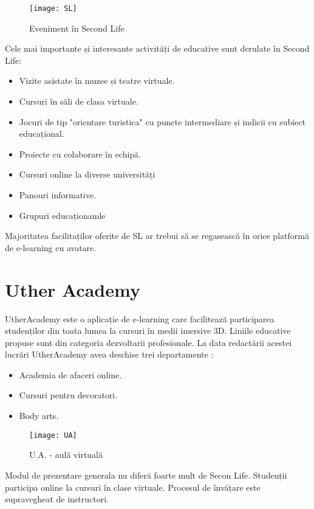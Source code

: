 \begin{figure}[h]
    \centering
    \texttt{[image: SL]}
    \caption{Eveniment în Second Life}
    \label{fig:imag3}
\end{figure}

\par Cele mai importante și interesante activități de educative sunt derulate în Second Life:
\begin{itemize}
\item Vizite asistate în muzee și teatre virtuale.
\item Cursuri în săli de clasa virtuale.
\item Jocuri de tip "orientare turistica" cu puncte intermediare și indicii cu subiect educațional.
\item Proiecte cu colaborare în echipă.
\item Cursuri online la diverse universități 
\item Panouri informative.
\item Grupuri educaționamle
\end{itemize}

\par Majoritatea facilitaților oferite de SL ar trebui să se regasească în orice platformă de e-learning cu avatare. 

\section{Uther Academy}
\par UtherAcademy este o aplicație de e-learning care facilitează participarea studenților din toata lumea la cursuri în medii imersive 3D. Liniile educative propuse sunt din categoria dezvoltarii profesionale. La data redactării acestei lucrări UtherAcademy avea deschise trei departamente :

\begin{itemize}
\item Academia de afaceri online.
\item Cursuri pentru decoratori.
\item Body arts.
\end{itemize}

\begin{figure}[h]
    \centering
    \texttt{[image: UA]}
    \caption{U.A. - aulă virtuală}
    \label{fig:imag4}
\end{figure}
    
\par Modul de prezentare generala nu diferă foarte mult de Secon Life. Studenții participa online la cursuri în clase virtuale. Procesul de învățare este supravegheat de instructori.

